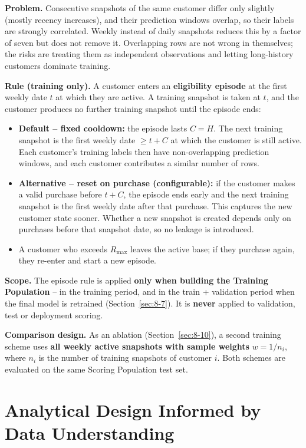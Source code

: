 \textbf{Problem.} Consecutive snapshots of the same customer differ only slightly (mostly recency increases), and their prediction windows overlap, so their labels are strongly correlated. Weekly instead of daily snapshots reduces this by a factor of seven but does not remove it. Overlapping rows are not wrong in themselves; the risks are treating them as independent observations and letting long-history customers dominate training.

\textbf{Rule (training only).} A customer enters an \textbf{eligibility episode} at the first weekly date $t$ at which they are active. A training snapshot is taken at $t$, and the customer produces no further training snapshot until the episode ends:

\begin{itemize}
    \item \textbf{Default -- fixed cooldown:} the episode lasts $C = H$. The next training snapshot is the first weekly date $\geq t + C$ at which the customer is still active. Each customer's training labels then have non-overlapping prediction windows, and each customer contributes a similar number of rows.
    \item \textbf{Alternative -- reset on purchase (configurable):} if the customer makes a valid purchase before $t + C$, the episode ends early and the next training snapshot is the first weekly date after that purchase. This captures the new customer state sooner. Whether a new snapshot is created depends only on purchases before that snapshot date, so no leakage is introduced.
    \item A customer who exceeds $R_{\max}$ leaves the active base; if they purchase again, they re-enter and start a new episode.
\end{itemize}

\textbf{Scope.} The episode rule is applied \textbf{only when building the Training Population} -- in the training period, and in the train + validation period when the final model is retrained (Section~\ref{sec:8-7}). It is \textbf{never} applied to validation, test or deployment scoring.

\textbf{Comparison design.} As an ablation (Section~\ref{sec:8-10}), a second training scheme uses \textbf{all weekly active snapshots with sample weights} $w = 1 / n_i$, where $n_i$ is the number of training snapshots of customer $i$. Both schemes are evaluated on the same Scoring Population test set.

\section{Analytical Design Informed by Data Understanding}
\label{sec:3-10}

